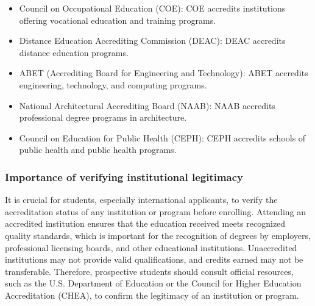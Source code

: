 \begin{itemize}
    \item Council on Occupational Education (COE): COE accredits institutions offering vocational education and training programs. 
    \item Distance Education Accrediting Commission (DEAC): DEAC accredits distance education programs.
    \item ABET (Accrediting Board for Engineering and Technology): ABET accredits engineering, technology, and computing programs. 
    \item National Architectural Accrediting Board (NAAB): NAAB accredits professional degree programs in architecture.
    \item Council on Education for Public Health (CEPH): CEPH accredits schools of public health and public health programs. 
\end{itemize}

\subsubsection{Importance of verifying institutional legitimacy}
It is crucial for students, especially international applicants, to verify the accreditation status of any institution or program before enrolling. Attending an accredited institution ensures that the education received meets recognized quality standards, which is important for the recognition of degrees by employers, professional licensing boards, and other educational institutions. Unaccredited institutions may not provide valid qualifications, and credits earned may not be transferable. Therefore, prospective students should consult official resources, such as the U.S. Department of Education or the Council for Higher Education Accreditation (CHEA), to confirm the legitimacy of an institution or program.


